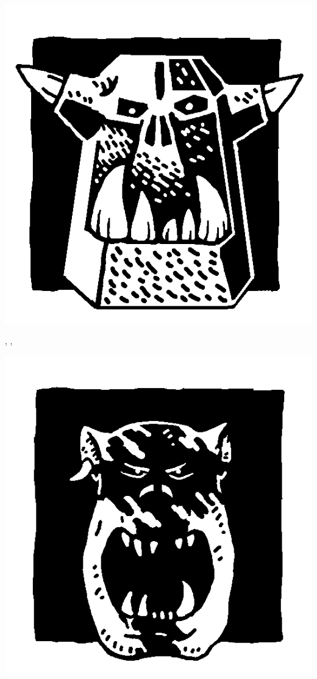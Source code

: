 \begin{multicols}{3}
\begin{center}
\includegraphics[width=\logosize]{pics/ironorc.png}
\vspace*{-1cm}\subsubtitle{\ironorc}

\immunetopsychology{}, \weaponmaster{}, \borntofight{}
\end{center}

\columnbreak

\begin{center}
\includegraphics[width=\logosize]{pics/feralorc.png}
\vspace*{-1cm}\subsubtitle{\feralorc}


\end{center}
\end{multicols}
